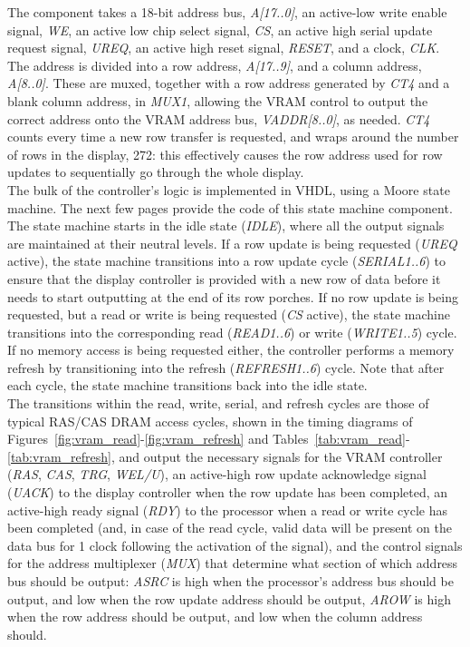 \documentclass[titlepage]{scrartcl}
\begin{document}
	The component takes a 18-bit address bus, \textit{A[17..0]}, an active-low write enable signal, \textit{WE}, an active low chip select signal, \textit{CS}, an active high serial update request signal, \textit{UREQ}, an active high reset signal, \textit{RESET}, and a clock, \textit{CLK}.\\

	The address is divided into a row address, \textit{A[17..9]}, and a column address, \textit{A[8..0]}. These are muxed, together with a row address generated by \textit{CT4} and a blank column address, in \textit{MUX1}, allowing the VRAM control to output the correct address onto the VRAM address bus, \textit{VADDR[8..0]}, as needed. \textit{CT4} counts every time a new row transfer is requested, and wraps around the number of rows in the display, 272: this effectively causes the row address used for row updates to sequentially go through the whole display.\\

	The bulk of the controller's logic is implemented in VHDL, using a Moore state machine. The next few pages provide the code of this state machine component. The state machine starts in the idle state (\textit{IDLE}), where all the output signals are maintained at their neutral levels. If a row update is being requested (\textit{UREQ} active), the state machine transitions into a row update cycle (\textit{SERIAL1..6}) to ensure that the display controller is provided with a new row of data before it needs to start outputting at the end of its row porches. If no row update is being requested, but a read or write is being requested (\textit{CS} active), the state machine transitions into the corresponding read (\textit{READ1..6}) or write (\textit{WRITE1..5}) cycle. If no memory access is being requested either, the controller performs a memory refresh by transitioning into the refresh (\textit{REFRESH1..6}) cycle. Note that after each cycle, the state machine transitions back into the idle state.\\

	

	The transitions within the read, write, serial, and refresh cycles are those of typical RAS/CAS DRAM access cycles, shown in the timing diagrams of Figures~\ref{fig:vram_read}-\ref{fig:vram_refresh} and Tables~\ref{tab:vram_read}-\ref{tab:vram_refresh}, and output the necessary signals for the VRAM controller (\textit{RAS}, \textit{CAS}, \textit{TRG}, \textit{WEL/U}), an active-high row update acknowledge signal (\textit{UACK}) to the display controller when the row update has been completed, an active-high ready signal (\textit{RDY}) to the processor when a read or write cycle has been completed (and, in case of the read cycle, valid data will be present on the data bus for 1 clock following the activation of the signal), and the control signals for the address multiplexer (\textit{MUX}) that determine what section of which address bus should be output: \textit{ASRC} is high when the processor's address bus should be output, and low when the row update address should be output, \textit{AROW} is high when the row address should be output, and low when the column address should.\\
\end{document}
